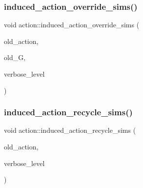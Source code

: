\mbox{\label{classaction_ac8cc7d4543f6ef75a04777bd82ca244b}} 
\subsubsection{\texorpdfstring{induced\+\_\+action\+\_\+override\+\_\+sims()}{induced\_action\_override\_sims()}}
{\footnotesize\ttfamily void action\+::induced\+\_\+action\+\_\+override\+\_\+sims (\begin{DoxyParamCaption}\item[{\mbox{\hyperlink{classaction}{action}} \&}]{old\+\_\+action,  }\item[{\mbox{\hyperlink{classsims}{sims}} $\ast$}]{old\+\_\+G,  }\item[{\mbox{\hyperlink{galois_8h_a09fddde158a3a20bd2dcadb609de11dc}{I\+NT}}}]{verbose\+\_\+level }\end{DoxyParamCaption})}

\mbox{\label{classaction_a3e74edeb058083aa57a8b31cb28ab88c}} 
\subsubsection{\texorpdfstring{induced\+\_\+action\+\_\+recycle\+\_\+sims()}{induced\_action\_recycle\_sims()}}
{\footnotesize\ttfamily void action\+::induced\+\_\+action\+\_\+recycle\+\_\+sims (\begin{DoxyParamCaption}\item[{\mbox{\hyperlink{classaction}{action}} \&}]{old\+\_\+action,  }\item[{\mbox{\hyperlink{galois_8h_a09fddde158a3a20bd2dcadb609de11dc}{I\+NT}}}]{verbose\+\_\+level }\end{DoxyParamCaption})}

\mbox{\label{classaction_a1cc425535be113a6f8a87c51a708d0d5}} 
